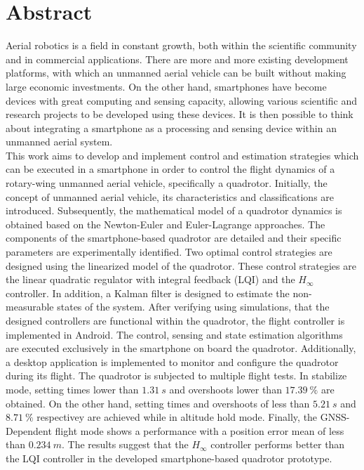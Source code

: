 \chapter*{Abstract} \label{abstract}
\setcounter{page}{5} 
Aerial robotics is a field in constant growth, both within the scientific community and in commercial applications. There are more and more existing development platforms, with which an unmanned aerial vehicle can be built without making large economic investments. On the other hand, smartphones have become devices with great computing and sensing capacity, allowing various scientific and research projects to be developed using these devices. It is then possible to think about integrating a smartphone as a processing and sensing device within an unmanned aerial system.
\\
This work aims to develop and implement control and estimation strategies which can be executed in a smartphone in order to control the flight dynamics of a rotary-wing unmanned aerial vehicle, specifically a quadrotor. Initially, the concept of unmanned aerial vehicle, its characteristics and classifications are introduced. Subsequently, the mathematical model of a quadrotor dynamics is obtained based on the Newton-Euler and Euler-Lagrange approaches. The components of the smartphone-based quadrotor are detailed and their specific parameters are experimentally identified. Two optimal control strategies are designed using the linearized model of the quadrotor. These control strategies are the linear quadratic regulator with integral feedback (LQI) and the $H_\infty$ controller. In addition, a Kalman filter is designed to estimate the non-measurable states of the system. After verifying using simulations, that the designed controllers are functional within the quadrotor, the flight controller is implemented in Android. The control, sensing and state estimation algorithms are executed exclusively in the smartphone on board the quadrotor. Additionally, a desktop application is implemented to monitor and configure the quadrotor during its flight. The quadrotor is subjected to multiple flight tests. In stabilize mode, setting times lower than $1.31\ s$ and overshoots lower than $17.39\ \%$ are obtained. On the other hand, setting times and overshoots of less than $5.21\ s$ and $8.71\ \%$ respectivey are achieved while in altitude hold mode. Finally, the GNSS-Dependent flight mode shows a performance with a position error mean of less than $0.234\ m$. The results suggest that the $H_\infty$ controller performs better than the LQI controller in the developed smartphone-based quadrotor prototype.
\\\\

